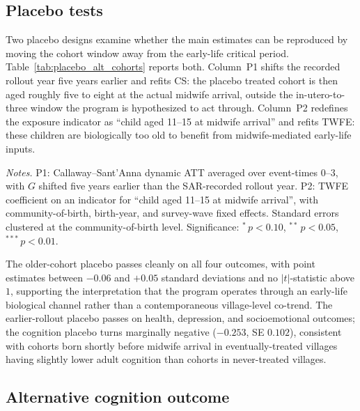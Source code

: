 \subsection{Placebo tests}

Two placebo designs examine whether the main estimates can be reproduced by moving the cohort window away from the early-life critical period. Table~\ref{tab:placebo_alt_cohorts} reports both. Column~P1 shifts the recorded rollout year five years earlier and refits CS: the placebo treated cohort is then aged roughly five to eight at the actual midwife arrival, outside the in-utero-to-three window the program is hypothesized to act through. Column~P2 redefines the exposure indicator as ``child aged 11--15 at midwife arrival'' and refits TWFE: these children are biologically too old to benefit from midwife-mediated early-life inputs.

\begin{table}[!htbp] \centering \caption{Alternative-cohort placebos.} \label{tab:placebo_alt_cohorts}  \begin{minipage}{0.92\textwidth} \footnotesize \emph{Notes.} P1: Callaway--Sant'Anna dynamic ATT averaged over event-times $0$--$3$, with $G$ shifted five years earlier than the SAR-recorded rollout year. P2: TWFE coefficient on an indicator for ``child aged 11--15 at midwife arrival'', with community-of-birth, birth-year, and survey-wave fixed effects. Standard errors clustered at the community-of-birth level. Significance: $^{*}\,p<0.10$, $^{**}\,p<0.05$, $^{***}\,p<0.01$. \end{minipage} \end{table}

The older-cohort placebo passes cleanly on all four outcomes, with point estimates between $-0.06$ and $+0.05$ standard deviations and no $|t|$-statistic above $1$, supporting the interpretation that the program operates through an early-life biological channel rather than a contemporaneous village-level co-trend. The earlier-rollout placebo passes on health, depression, and socioemotional outcomes; the cognition placebo turns marginally negative ($-0.253$, SE $0.102$), consistent with cohorts born shortly before midwife arrival in eventually-treated villages having slightly lower adult cognition than cohorts in never-treated villages.

\subsection{Alternative cognition outcome}

